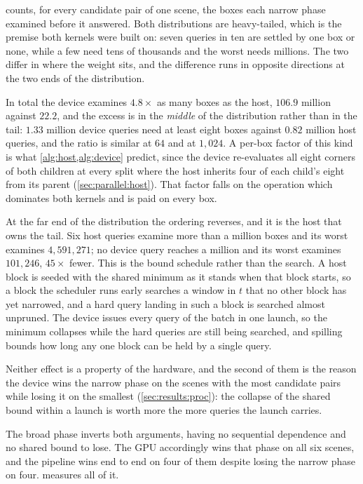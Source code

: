  counts, for every candidate pair of one scene, the boxes
each narrow phase examined before it answered. Both distributions are
heavy-tailed, which is the premise both kernels were built on: seven queries in
ten are settled by one box or none, while a few need tens of thousands and the
worst needs millions. The two differ in where the weight sits, and the
difference runs in opposite directions at the two ends of the distribution.

In total the device examines $4.8\times$ as many boxes as the host,
$106.9$ million against $22.2$, and the excess is in the \emph{middle} of the
distribution rather than in the tail: $1.33$ million device queries need at
least eight boxes against $0.82$ million host queries, and the ratio is similar
at $64$ and at $1{,}024$. A per-box factor of this kind is what
\cref{alg:host,alg:device} predict, since the device re-evaluates all eight
corners of both children at every split where the host inherits four of each
child's eight from its parent (\cref{sec:parallel:host}). That factor falls on
the operation which dominates both kernels and is paid on every box.

At the far end of the distribution the ordering reverses, and it is the host that
owns the tail. Six host queries examine more than a million boxes and its worst
examines $4{,}591{,}271$; no device query reaches a million and its worst
examines $101{,}246$, $45\times$ fewer. This is the bound schedule rather than
the search. A host block is seeded with the shared minimum as it stands when that
block starts, so a block the scheduler runs early searches a window in $t$ that
no other block has yet narrowed, and a hard query landing in such a block is
searched almost unpruned. The device issues every query of the batch in one
launch, so the minimum collapses while the hard queries are still being searched,
and spilling bounds how long any one block can be held by a single query.

Neither effect is a property of the hardware, and the second of them is the
reason the device wins the narrow phase on the scenes with the most candidate
pairs while losing it on the smallest (\cref{sec:results:proc}): the collapse of
the shared bound within a launch is worth more the more queries the launch
carries.

The broad phase inverts both arguments, having no sequential dependence and no
shared bound to lose. The GPU accordingly wins that phase on all six scenes, and
the pipeline wins end to end on four of them despite losing the narrow phase on
four.  measures all of it.


